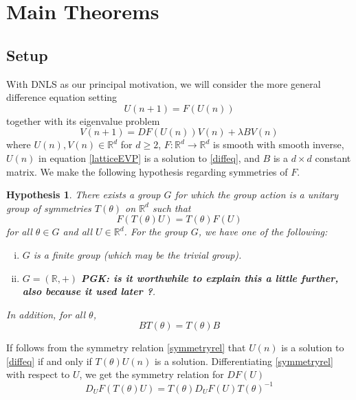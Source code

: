 \documentclass[12pt]{article}
\def\R{{\mathbb R}}
\newtheorem{hypothesis}{Hypothesis}
\begin{document}
\section{Main Theorems}

\subsection{Setup}

With DNLS as our principal motivation, we will consider the more general difference equation setting
\begin{equation}\label{diffeq}
U(n+1) = F(U(n))
\end{equation}
together with its eigenvalue problem
\begin{equation}\label{latticeEVP}
V(n+1) = DF(U(n)) V(n) + \lambda B V(n)
\end{equation}
where $U(n), V(n) \in \R^d$ for $d \geq 2$, $F: \R^d \rightarrow \R^d$ is smooth with smooth inverse, $U(n)$ in equation \eqref{latticeEVP} is a solution to \eqref{diffeq}, and $B$ is a $d \times d$ constant matrix. We make the following hypothesis regarding symmetries of $F$.

\begin{hypothesis}\label{symmetryhyp}
There exists a group $G$ for which the group action is a unitary group of symmetries $T(\theta)$ on $\R^d$ such that 
\begin{equation}\label{symmetryrel}
F(T(\theta)U) = T(\theta)F(U)
\end{equation}
for all $\theta \in G$ and all $U \in \R^d$. For the group $G$, we have one of the following:
\begin{enumerate}[(i)]
\item $G$ is a finite group (which may be the trivial group).
\item $G = (\R, +)$ {\bf PGK: is it worthwhile to explain this
a little further, also because it used later ?}. 
\end{enumerate}
In addition, for all $\theta$, 
\begin{equation}\label{BTcommute}
B T(\theta) = T(\theta) B
\end{equation}
\end{hypothesis}
If follows from the symmetry relation \eqref{symmetryrel} that $U(n)$ is a solution to \eqref{diffeq} if and only if $T(\theta)U(n)$ is a solution. Differentiating \eqref{symmetryrel} with respect to $U$, we get the symmetry relation for $DF(U)$
\begin{equation}\label{DFtheta}
D_U F(T(\theta)U) = T(\theta) D_U F(U)T(\theta)^{-1}
\end{equation}
\end{document}
